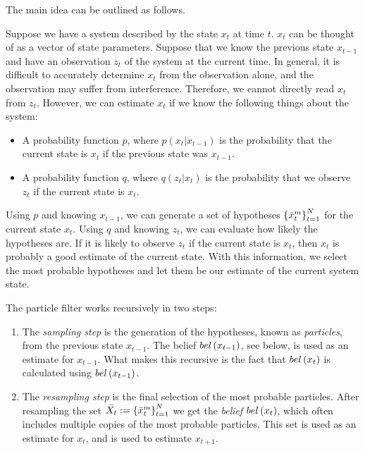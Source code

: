 The main idea can be outlined as follows.

Suppose we have a system described by the state $x_t$ at time $t$. $x_t$ can be thought of as a vector of state parameters. Suppose that we know the previous state $x_{t-1}$ and have an observation $z_t$ of the system at the current time. In general, it is difficult to accurately determine $x_t$ from the observation alone, and the observation may suffer from interference. Therefore, we cannot directly read $x_t$ from $z_t$. However, we can estimate $x_t$ if we know the following things about the system:

\begin{itemize}
\item A probability function $p$, where $p\left(x_t | x_{t-1}\right)$ is the probability that the current state is $x_t$ if the previous state was $x_{t-1}$.
\item A probability function $q$, where $q\left(z_t | x_t\right)$ is the probability that we observe $z_t$ if the current state is $x_t$.
\end{itemize}

Using $p$ and knowing $x_{t-1}$, we can generate a set of hypotheses $\left\{\bar{x}_{t}^{m}\right\}_{t=1}^{N}$ for the current state $x_t$. Using $q$ and knowing $z_t$, we can evaluate how likely the hypotheses are. If it is likely to observe $z_t$ if the current state is $x_t$, then $x_t$ is probably a good estimate of the current state. With this information, we select the most probable hypotheses and let them be our estimate of the current system state.

The particle filter works recursively in two steps:

\begin{enumerate}
\item The \emph{sampling step} is the generation of the hypotheses, known as \emph{particles}, from the previous state $x_{t-1}$. The belief $bel\left(x_{t-1}\right)$, see below, is used as an estimate for $x_{t-1}$. What makes this recursive is the fact that $bel\left(x_t\right)$ is calculated using $bel\left(x_{t-1}\right)$.

\item The \emph{resampling step} is the final selection of the most probable particles. After resampling the set $\bar{X_t} := \left\{\bar{x}_{t}^{m}\right\}_{t=1}^{N}$ we get the \emph{belief} $bel\left(x_t\right)$, which often includes multiple copies of the most probable particles. This set is used as an estimate for $x_t$, and is used to estimate $x_{t+1}$.
\end{enumerate}

